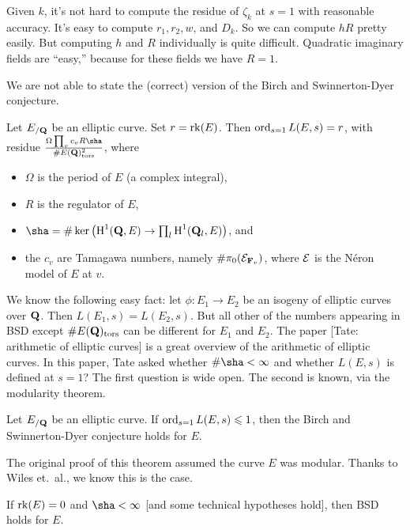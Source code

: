 Given $k$, it's not hard to compute the residue of $\zeta_k$ at $s=1$ with 
reasonable accuracy. It's easy to compute $r_1,r_2,w$, and $D_k$. So we can 
compute $h R$ pretty easily. But computing $h$ and $R$ individually is quite 
difficult. Quadratic imaginary fields are ``easy,'' because for these fields 
we have $R=1$. 

We are not able to state the (correct) version of the Birch and Swinnerton-Dyer 
conjecture. 

\begin{conjecture}
Let $E_{/\mathbf{Q}}$ be an elliptic curve. Set $r=\operatorname{rk}(E)$. Then 
$\operatorname{ord}_{s=1} L(E,s) = r$, with residue 
$\frac{\Omega \prod_v c_v R \sha}{\# E(\dQ)_\mathrm{tors}^2}$, where 
\begin{itemize}
\item $\Omega$ is the period of $E$ (a complex integral), 
\item $R$ is the regulator of $E$, 
\item $\sha=\#\ker\left(\h^1(\dQ,E)\to \prod_l \h^1(\dQ_l,E)\right)$, and 
\item the $c_v$ are Tamagawa numbers, namely $\#\pi_0(\mathcal{E}_{\mathbf{F}_v})$, where 
$\mathcal{E}$ is the N\'eron model of $E$ at $v$. 
\end{itemize}
\end{conjecture}

We know the following easy fact: let $\phi:E_1\to E_2$ be an isogeny of 
elliptic curves over $\mathbf{Q}$. Then $L(E_1,s)=L(E_2,s)$. But all other 
of the numbers appearing in BSD except $\# E(\mathbf{Q})_\mathrm{tors}$ can be 
different for $E_1$ and $E_2$. The paper [Tate: arithmetic of elliptic 
curves] is a great overview of the arithmetic of elliptic curves. In this 
paper, Tate asked whether $\# \sha<\infty$ and whether $L(E,s)$ is defined at 
$s=1$? The first question is wide open. The second is known, via the 
modularity theorem. 

\begin{theorem}
Let $E_{/\mathbf{Q}}$ be an elliptic curve. If $\operatorname{ord}_{s=1}L(E,s)\leqslant 1$, 
then the Birch and Swinnerton-Dyer conjecture holds for $E$. 
\end{theorem}

The original proof of this theorem assumed the curve $E$ was modular. Thanks 
to Wiles et.~al., we know this is the case. 

\begin{theorem}
If $\operatorname{rk}(E)=0$ and $\sha<\infty$ [and some technical hypotheses hold], then 
BSD holds for $E$. 
\end{theorem}

